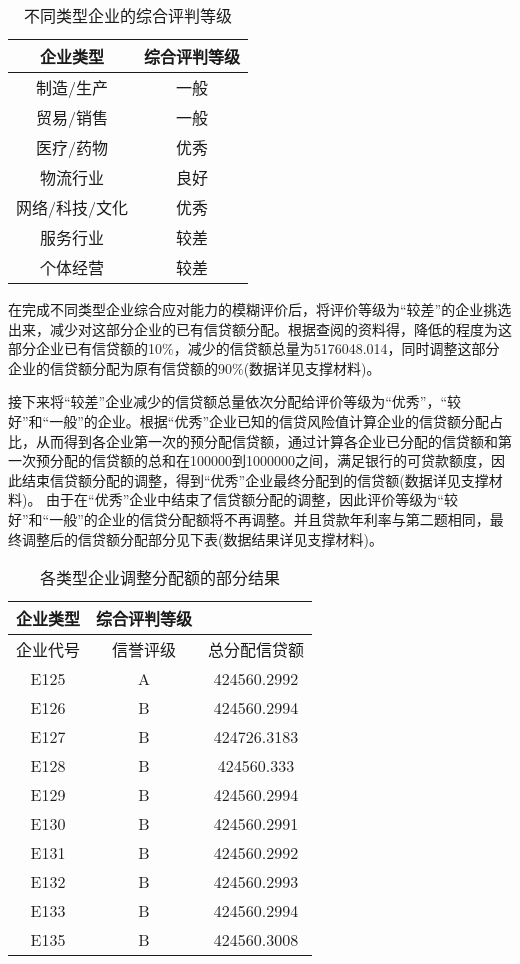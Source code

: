 \documentclass{cumcmthesis}
\begin{document}
\begin{table}[H]   %
	\caption{不同类型企业的综合评判等级}	\centering
	\begin{tabular}{cc}
		\toprule[1.5pt]
		企业类型 & 综合评判等级\\
		\midrule[1pt]
		制造/生产   & 一般\\
		贸易/销售   & 一般\\
		医疗/药物   & 优秀\\
		物流行业   & 良好\\
		网络/科技/文化 & 优秀 \\
		服务行业   & 较差\\
		个体经营 & 较差 \\
		\bottomrule[1.5pt]
	\end{tabular}
\end{table}	

在完成不同类型企业综合应对能力的模糊评价后，将评价等级为“较差”的企业挑选出来，减少对这部分企业的已有信贷额分配。根据查阅的资料得，降低的程度为这部分企业已有信贷额的10$\%$，减少的信贷额总量为5176048.014，同时调整这部分企业的信贷额分配为原有信贷额的90$\%$(数据详见支撑材料)。

接下来将“较差”企业减少的信贷额总量依次分配给评价等级为“优秀”，“较好”和“一般”的企业。根据“优秀”企业已知的信贷风险值计算企业的信贷额分配占比，从而得到各企业第一次的预分配信贷额，通过计算各企业已分配的信贷额和第一次预分配的信贷额的总和在100000到1000000之间，满足银行的可贷款额度，因此结束信贷额分配的调整，得到“优秀”企业最终分配到的信贷额(数据详见支撑材料)。
由于在“优秀”企业中结束了信贷额分配的调整，因此评价等级为“较好”和“一般”的企业的信贷分配额将不再调整。并且贷款年利率与第二题相同，最终调整后的信贷额分配部分见下表(数据结果详见支撑材料)。

\begin{table}[H]   %
	\caption{各类型企业调整分配额的部分结果}	\centering
	\begin{tabular}{ccc}
		\toprule[1.5pt]
		企业类型 & 综合评判等级\\
		\midrule[1pt]
企业代号 & 信誉评级 & 总分配信贷额      \\
E125 & A    & 424560.2992 \\
E126 & B    & 424560.2994 \\
E127 & B    & 424726.3183 \\
E128 & B    & 424560.333  \\
E129 & B    & 424560.2994 \\
E130 & B    & 424560.2991 \\
E131 & B    & 424560.2992 \\
E132 & B    & 424560.2993 \\
E133 & B    & 424560.2994 \\
E135 & B    & 424560.3008 \\
		\bottomrule[1.5pt]
\end{tabular}
\end{table}	
\end{document}
